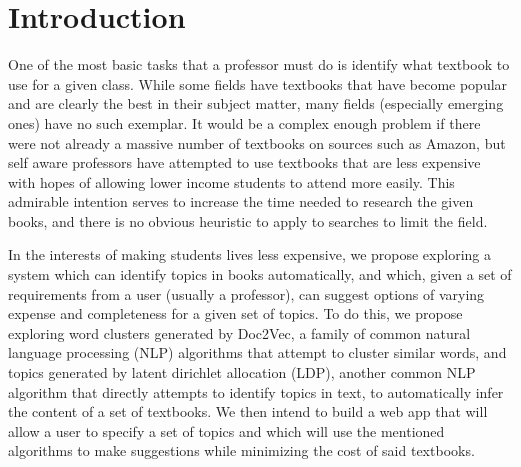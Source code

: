 
\section{Introduction}
One of the most basic tasks that a professor must do is identify what textbook to use for a given class.
While some fields have textbooks that have become popular and are clearly the best in their subject matter, many fields (especially emerging ones) have no such exemplar.  
It would be a complex enough problem if there were not already a massive number of textbooks on sources such as Amazon, but self aware professors have attempted to use textbooks that are less expensive with hopes of allowing lower income students to attend more easily.  
This admirable intention serves to increase the time needed to research the given books, and there is no obvious heuristic to apply to searches to limit the field.  

In the interests of making students lives less expensive, we propose exploring a system which can identify topics in books automatically, and which, given a set of requirements from a user (usually a professor), can suggest options of varying expense and completeness for a given set of topics.  To do this, we propose exploring word clusters generated by Doc2Vec, a family of common natural language processing (NLP) algorithms that attempt to cluster similar words, and topics generated by latent dirichlet allocation (LDP), another common NLP algorithm that directly attempts to identify topics in text, to automatically infer the content of a set of textbooks.  We then intend to build a web app that will allow a user to specify a set of topics and which will use the mentioned algorithms to make suggestions while minimizing the cost of said textbooks.  